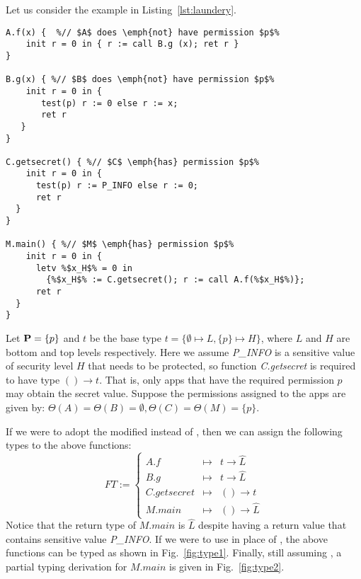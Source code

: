 {{{Let us consider the example in Listing~\ref{lst:laundery}.
\begin{lstlisting}[float=tp, label={lst:laundery}, caption={An example illustrating the parameter laundering issue.}]
A.f(x) {  %// $A$ does \emph{not} have permission $p$%
	init r = 0 in { r := call B.g (x); ret r }
}
	
B.g(x) { %// $B$ does \emph{not} have permission $p$%
	init r = 0 in {
	   test(p) r := 0 else r := x;
	   ret r 
   }
}

C.getsecret() { %// $C$ \emph{has} permission $p$%
	init r = 0 in {
	  test(p) r := P_INFO else r := 0;
	  ret r 
  }
}

M.main() { %// $M$ \emph{has} permission $p$%
    init r = 0 in {
	  letv %$x_H$% = 0 in
	  	{%$x_H$% := C.getsecret(); r := call A.f(%$x_H$%)};
      ret r
  }
}
\end{lstlisting}
Let $\mathbf{P}=\{p\}$ and $t$ be the base type $t =  \{\emptyset \mapsto L, \{p\} \mapsto H\}$,
where $L$ and $H$ are bottom and top levels respectively. Here we assume \textit{P\_INFO} is a sensitive value
of security level $H$ that needs to be protected, so function \textit{C.getsecret} is required to have type $() \rightarrow t$. That is, only apps that have the required permission $p$ may obtain
the secret value.
Suppose the permissions assigned to the apps are given by:  $\Theta(A) =  \Theta(B) = \emptyset, \Theta(C) = \Theta(M) = \{p\}.$

If we were to adopt the modified  instead of , then we can assign the following
types to the above functions:
\[
FT := \left\{
\begin{array}{lcl}
A.f & \mapsto & t \rightarrow \hat{L} \\
B.g & \mapsto & t \rightarrow \hat{L}\\
C.getsecret & \mapsto & () \rightarrow t\\
M.main & \mapsto  & () \rightarrow \hat{L}
\end{array}
\right.
\]
Notice that the return type of $M.main$ is $\hat{L}$ despite having a
return value that contains sensitive value \textit{P\_INFO}.
If we were to use  in place of , the above functions can
be typed as shown in Fig.~\ref{fig:type1}.
Finally, still assuming , a partial typing
derivation for $M.main$ is given in Fig.~\ref{fig:type2}.

}}}
